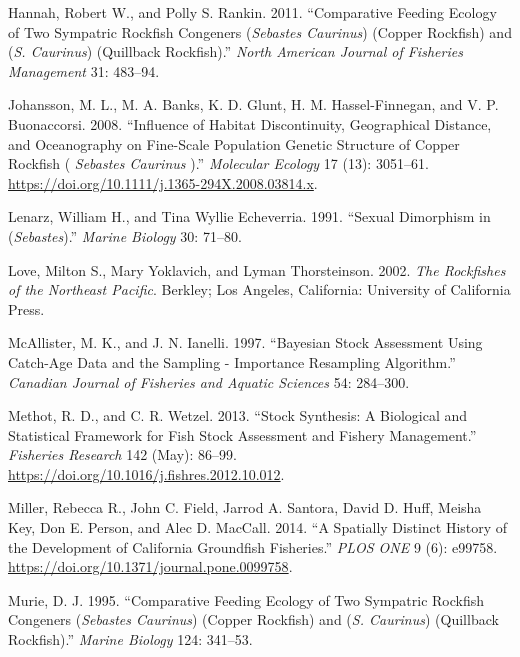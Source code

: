\documentclass[11pt,
  english,
  a4paper,
]{article}
\begin{document}
\leavevmode\hypertarget{ref-HannahandRankin_rockfish_site_fidelity_2011}{}%
Hannah, Robert W., and Polly S. Rankin. 2011. ``Comparative Feeding Ecology of Two Sympatric Rockfish Congeners (\emph{Sebastes Caurinus}) (Copper Rockfish) and (\emph{S. Caurinus}) (Quillback Rockfish).'' \emph{North American Journal of Fisheries Management} 31: 483--94.

\leavevmode\hypertarget{ref-johansson_influence_2008}{}%
Johansson, M. L., M. A. Banks, K. D. Glunt, H. M. Hassel-Finnegan, and V. P. Buonaccorsi. 2008. ``Influence of Habitat Discontinuity, Geographical Distance, and Oceanography on Fine-Scale Population Genetic Structure of Copper Rockfish ( \emph{Sebastes Caurinus} ).'' \emph{Molecular Ecology} 17 (13): 3051--61. \url{https://doi.org/10.1111/j.1365-294X.2008.03814.x}.

\leavevmode\hypertarget{ref-LenarzandEcheverria_dimorphism_1991}{}%
Lenarz, William H., and Tina Wyllie Echeverria. 1991. ``Sexual Dimorphism in (\emph{Sebastes}).'' \emph{Marine Biology} 30: 71--80.

\leavevmode\hypertarget{ref-loveetal_2002}{}%
Love, Milton S., Mary Yoklavich, and Lyman Thorsteinson. 2002. \emph{The Rockfishes of the Northeast Pacific}. Berkley; Los Angeles, California: University of California Press.

\leavevmode\hypertarget{ref-mcallister_bayesian_1997}{}%
McAllister, M. K., and J. N. Ianelli. 1997. ``Bayesian Stock Assessment Using Catch-Age Data and the Sampling - Importance Resampling Algorithm.'' \emph{Canadian Journal of Fisheries and Aquatic Sciences} 54: 284--300.

\leavevmode\hypertarget{ref-methot_stock_2013}{}%
Methot, R. D., and C. R. Wetzel. 2013. ``Stock Synthesis: A Biological and Statistical Framework for Fish Stock Assessment and Fishery Management.'' \emph{Fisheries Research} 142 (May): 86--99. \url{https://doi.org/10.1016/j.fishres.2012.10.012}.

\leavevmode\hypertarget{ref-Milleretal_2014}{}%
Miller, Rebecca R., John C. Field, Jarrod A. Santora, David D. Huff, Meisha Key, Don E. Person, and Alec D. MacCall. 2014. ``A Spatially Distinct History of the Development of California Groundfish Fisheries.'' \emph{PLOS ONE} 9 (6): e99758. \url{https://doi.org/10.1371/journal.pone.0099758}.

\leavevmode\hypertarget{ref-Murie_diet_1995}{}%
Murie, D. J. 1995. ``Comparative Feeding Ecology of Two Sympatric Rockfish Congeners (\emph{Sebastes Caurinus}) (Copper Rockfish) and (\emph{S. Caurinus}) (Quillback Rockfish).'' \emph{Marine Biology} 124: 341--53.
\end{document}
